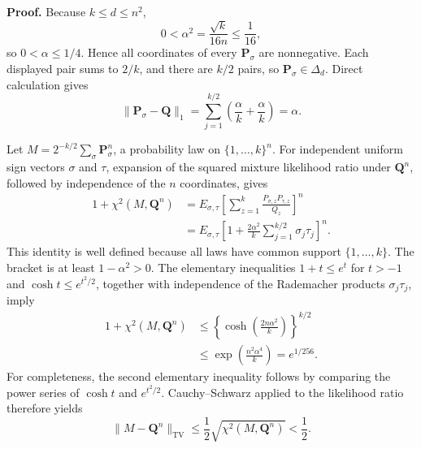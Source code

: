 \textbf{Proof.}
Because \(k\le d\le n^2\),
\[
 0<\alpha^2=\frac{\sqrt{k}}{16n}\le\frac1{16},
\]
so \(0<\alpha\le1/4\).  Hence all coordinates of every \(\mathbf P_\sigma\) are nonnegative.  Each displayed pair sums to \(2/k\), and there are \(k/2\) pairs, so \(\mathbf P_\sigma\in\Delta_d\).  Direct calculation gives
\[
 \lVert\mathbf P_\sigma-\mathbf Q\rVert_1
 =\sum_{j=1}^{k/2}
   \left(\frac{\alpha}{k}+\frac{\alpha}{k}\right)
 =\alpha.
\]

Let \(M=2^{-k/2}\sum_\sigma\mathbf P_\sigma^n\), a probability law on \(\{1,\ldots,k\}^n\).  For independent uniform sign vectors \(\sigma\) and \(\tau\), expansion of the squared mixture likelihood ratio under \(\mathbf Q^n\), followed by independence of the \(n\) coordinates, gives
\[
 \begin{aligned}
 1+\chi^2(M,\mathbf Q^n)
 &=E_{\sigma,\tau}\left[
   \sum_{z=1}^{k}\frac{P_{\sigma,z}P_{\tau,z}}{Q_z}
  \right]^n\\
 &=E_{\sigma,\tau}\left[
  1+\frac{2\alpha^2}{k}
     \sum_{j=1}^{k/2}\sigma_j\tau_j
  \right]^n.
 \end{aligned}
\]
This identity is well defined because all laws have common support \(\{1,\ldots,k\}\).  The bracket is at least \(1-\alpha^2>0\).  The elementary inequalities \(1+t\le e^t\) for \(t>-1\) and \(\cosh t\le e^{t^2/2}\), together with independence of the Rademacher products \(\sigma_j\tau_j\), imply
\[
 \begin{aligned}
 1+\chi^2(M,\mathbf Q^n)
 &\le
 \left\{\cosh\left(\frac{2n\alpha^2}{k}\right)\right\}^{k/2}\\
 &\le \exp\left(\frac{n^2\alpha^4}{k}\right)
 =e^{1/256}.
 \end{aligned}
\]
For completeness, the second elementary inequality follows by comparing the power series of \(\cosh t\) and \(e^{t^2/2}\).  Cauchy--Schwarz applied to the likelihood ratio therefore yields
\[
 \lVert M-\mathbf Q^n\rVert_{\mathrm{TV}}
 \le\frac12\sqrt{\chi^2(M,\mathbf Q^n)}<\frac12.
\]


